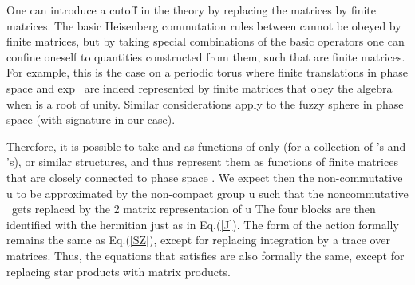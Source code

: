 \documentclass[a4paper,12pt]{article}
\begin{document}
One can introduce a cutoff in the theory by replacing the matrices by finite
matrices. The basic Heisenberg commutation rules between \coordHE{} cannot be obeyed by finite matrices, but by taking
special combinations of the basic operators \coordHE{}
one can confine oneself to quantities \coordHE{} constructed from them, such
that \coordHE{} are finite matrices. For example, this is the case on a
periodic torus where finite translations in phase space \coordHE{} and \coordHE{}exp\coordHE{} \ are
indeed represented by finite matrices that obey the algebra \coordHE{} when \coordHE{} is a root of unity. Similar considerations apply to the fuzzy
sphere in phase space (with \coordHE{} signature in our case).

Therefore, it is possible to take \coordHE{} and \coordHE{} as functions of only \coordHE{} (for a collection of \coordHE{}'s and \coordHE{}'s), or similar structures,
and thus represent them as functions of finite matrices that are closely
connected to phase space \coordHE{}. We expect then
the non-commutative u\coordHE{} to be approximated by the
non-compact group u\coordHE{} such that the \coordHE{}
noncommutative \coordHE{} \ gets replaced by the 2\coordHE{} matrix
representation of u\coordHE{} The four \coordHE{} blocks are
then identified with the hermitian \coordHE{} just as in Eq.(\ref{J}).
The form of the action formally remains the same as Eq.(\ref{SZ}), except
for replacing integration by a trace over matrices. Thus, the equations that 
\coordHE{} satisfies are also formally the same, except for replacing
star products with matrix products.
\end{document}
